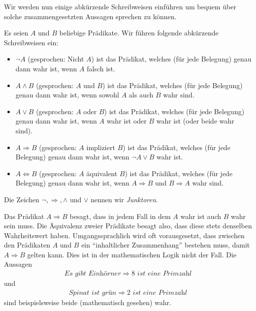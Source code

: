 Wir werden nun einige abkürzende Schreibweisen einführen um bequem über solche zusammengesetzten Aussagen sprechen zu können.

\begin{df}
Es seien $A$ und $B$ beliebige Prädikate. Wir führen folgende abkürzende Schreibweisen ein:
\begin{itemize}
\item $\neg A$ (gesprochen: Nicht $A$) ist das Prädikat, welches (für jede Belegung) genau dann wahr ist, wenn $A$ falsch ist.
 \item $A\wedge B$ (gesprochen: $A$ und $B$)  ist das Prädikat, welches (für jede Belegung) genau dann wahr ist, wenn sowohl $A$ als auch $B$ wahr sind.
\item $A\vee B$ (gesprochen: $A$ oder $B$)  ist das Prädikat, welches (für jede Belegung) genau dann wahr ist, wenn $A$ wahr ist oder $B$ wahr ist (oder beide wahr sind).
\item $A\Rightarrow B$ (gesprochen: $A$ impliziert $B$) ist das Prädikat, welches (für jede Belegung) genau dann wahr ist, wenn $\neg A\vee B$ wahr ist.
\item $A\Leftrightarrow B$ (gesprochen: $A$ äquivalent $B$)  ist das Prädikat, welches (für jede Belegung) genau dann wahr ist, wenn $A\Rightarrow B$ und $B\Rightarrow A$ wahr sind.
\end{itemize}
Die Zeichen $\neg,\Rightarrow,\wedge$ und $\vee$ nennen wir \textit{Junktoren}.
\end{df}

\begin{rk}
Das Prädikat $A\Rightarrow B$ besagt, dass in jedem Fall in dem $A$ wahr ist auch $B$ wahr sein muss.
Die Äquivalenz zweier Prädikate besagt also, dass diese stets denselben Wahrheitswert haben. Umgangssprachlich wird oft vorausgesetzt, dass zwischen den Prädikaten $A$ und $B$ ein ``inhaltlicher Zusammenhang'' bestehen muss, damit $A\Rightarrow B$ gelten kann. Dies ist in der mathematischen Logik nicht der Fall. Die Aussagen
\begin{align*}
\textit{Es gibt Einhörner}\Rightarrow 8\textit{ ist eine Primzahl}
\end{align*}
und
\begin{align*}
\textit{Spinat ist grün}\Rightarrow 2\textit{ ist eine Primzahl}
\end{align*}
sind beispielsweise beide (mathematisch gesehen) wahr.
\end{rk}


